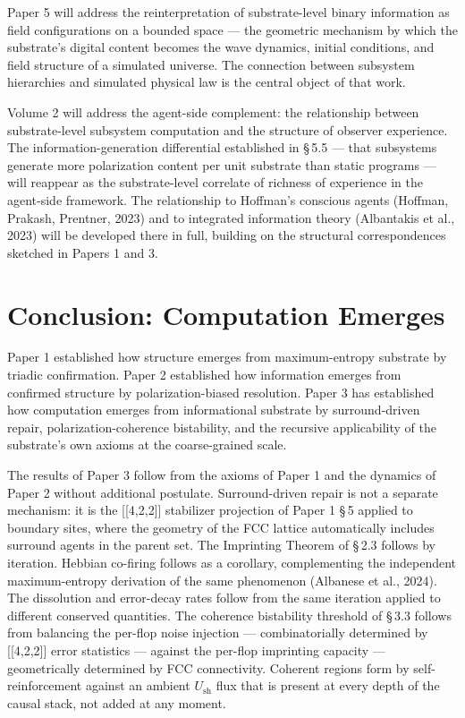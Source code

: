 \documentclass[11pt,oneside]{report}
\theoremstyle{definition}
\theoremstyle{remark}
\begin{document}
Paper 5 will address the reinterpretation of substrate-level binary
information as field configurations on a bounded space --- the geometric
mechanism by which the substrate's digital content becomes the wave
dynamics, initial conditions, and field structure of a simulated
universe. The connection between subsystem hierarchies and simulated
physical law is the central object of that work.

Volume 2 will address the agent-side complement: the relationship
between substrate-level subsystem computation and the structure of
observer experience. The information-generation differential established
in \S\,5.5 --- that subsystems generate more polarization content per unit
substrate than static programs --- will reappear as the substrate-level
correlate of richness of experience in the agent-side framework. The
relationship to Hoffman's conscious agents (Hoffman, Prakash, Prentner,
2023) and to integrated information theory (Albantakis et al., 2023)
will be developed there in full, building on the structural
correspondences sketched in Papers 1 and 3.

\section*{Conclusion: Computation Emerges}

Paper 1 established how structure emerges from maximum-entropy substrate
by triadic confirmation. Paper 2 established how information emerges
from confirmed structure by polarization-biased resolution. Paper 3 has
established how computation emerges from informational substrate by
surround-driven repair, polarization-coherence bistability, and the
recursive applicability of the substrate's own axioms at the
coarse-grained scale.

The results of Paper 3 follow from the axioms of Paper 1 and the
dynamics of Paper 2 without additional postulate. Surround-driven repair
is not a separate mechanism: it is the [[4,2,2]] stabilizer
projection of Paper 1 \S\,5 applied to boundary sites, where the geometry
of the FCC lattice automatically includes surround agents in the parent
set. The Imprinting Theorem of \S\,2.3 follows by iteration. Hebbian
co-firing follows as a corollary, complementing the independent
maximum-entropy derivation of the same phenomenon (Albanese et al.,
2024). The dissolution and error-decay rates follow from the same
iteration applied to different conserved quantities. The coherence
bistability threshold of \S\,3.3 follows from balancing the per-flop noise
injection --- combinatorially determined by [[4,2,2]] error
statistics --- against the per-flop imprinting capacity ---
geometrically determined by FCC connectivity. Coherent regions form by
self-reinforcement against an ambient \ensuremath{U_{\mathrm{sh}}} flux that is present at every
depth of the causal stack, not added at any moment.
\end{document}
